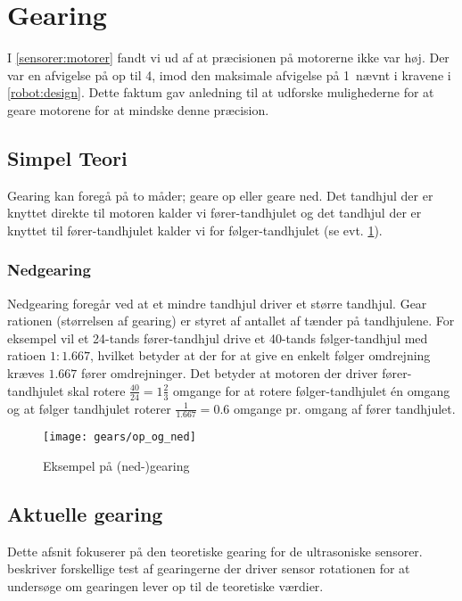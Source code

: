 \section{Gearing}\label{robot:gearing}
I \cref{sensorer:motorer} fandt vi ud af at præcisionen på motorerne ikke var høj.
Der var en afvigelse på op til 4\dg, imod den maksimale afvigelse på 1\dg ~nævnt i kravene i \cref{robot:design}.
Dette faktum gav anledning til at udforske mulighederne for at geare motorene for at mindske denne præcision.

\subsection{Simpel Teori}\label{gearing:simpel_teori}
Gearing kan foregå på to måder; geare op eller geare ned.
Det tandhjul der er knyttet direkte til motoren kalder vi fører-tandhjulet og det tandhjul der er knyttet til fører-tandhjulet kalder vi for følger-tandhjulet (se evt. \cref{gearing:nedgearing}).

\subsubsection{Nedgearing}
Nedgearing foregår ved at et mindre tandhjul driver et større tandhjul.
Gear rationen (størrelsen af gearing) er styret af antallet af tænder på tandhjulene.
For eksempel vil et 24-tands fører-tandhjul drive et 40-tands følger-tandhjul med ratioen $1:1.667$, hvilket betyder at der for at give en enkelt følger omdrejning kræves $1.667$ fører omdrejninger. 
Det betyder at motoren der driver fører-tandhjulet skal rotere $\frac{40}{24} = 1 \frac{2}{3}$ omgange for at rotere følger-tandhjulet én omgang og at følger tandhjulet roterer $\frac{1}{1.667} = 0.6$ omgange pr. omgang af fører tandhjulet.


\begin{figure}[h]
\centering
\texttt{[image: gears/op\_og\_ned]}
\caption{Eksempel på (ned-)gearing}
\label{gearing:nedgearing}
\end{figure}

\subsection{Aktuelle gearing}
Dette afsnit fokuserer på den teoretiske gearing for de ultrasoniske sensorer.
 beskriver forskellige test af gearingerne der driver sensor rotationen for at undersøge om gearingen lever op til de teoretiske værdier.


